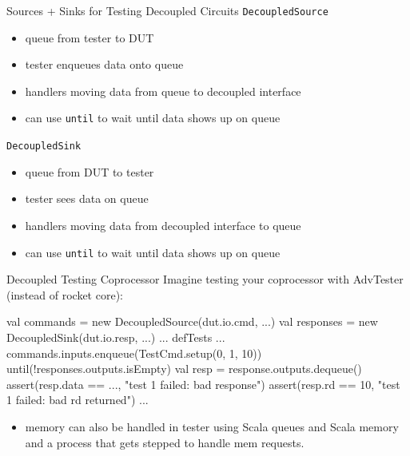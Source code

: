 \documentclass[xcolor=pdflatex,dvipsnames,table]{beamer}
\begin{document}
\begin{frame}[fragile]{Sources + Sinks for Testing Decoupled Circuits}
\verb+DecoupledSource+
\begin{itemize}
\item queue from tester to DUT
\item tester enqueues data onto queue
\item handlers moving data from queue to decoupled interface
\item can use \verb+until+ to wait until data shows up on queue
\end{itemize}
\verb+DecoupledSink+
\begin{itemize}
\item queue from DUT to tester
\item tester sees data on queue
\item handlers moving data from decoupled interface to queue
\item can use \verb+until+ to wait until data shows up on queue
\end{itemize}
\end{frame}

\begin{frame}[fragile]{Decoupled Testing Coprocessor}
Imagine testing your coprocessor with AdvTester (instead of rocket core):
\begin{scala}
val commands  = new DecoupledSource(dut.io.cmd, ...)
val responses = new DecoupledSink(dut.io.resp, ...)
...
defTests {
  ...
  commands.inputs.enqueue(TestCmd.setup(0, 1, 10))
  until(!responses.outputs.isEmpty) { } 
  val resp = response.outputs.dequeue()
  assert(resp.data == ..., "test 1 failed: bad response")
  assert(resp.rd == 10, "test 1 failed: bad rd returned")
  ...
}  
\end{scala}
\begin{itemize}
\item memory can also be handled in tester using Scala queues and Scala memory and a process that gets stepped to handle mem requests.
\end{itemize}
\end{frame}
\end{document}
